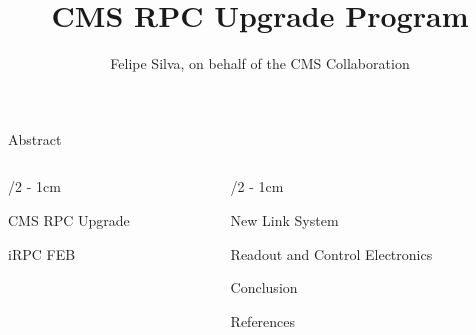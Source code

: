 \documentclass[portrait]{uioposter}
\title{CMS RPC Upgrade Program}
\author
{%
    Felipe Silva, on behalf of the CMS Collaboration
}
\institute
{
   Rio de Janeiro State University - Email: felipe.silva@cern.ch
}
\begin{document}
\begin{frame}


    \begin{block}{Abstract}
        \vskip-1.5cm
        
    \end{block}

\begin{columns}[onlytextwidth]

\begin{column}{\textwidth/2 - 1cm}

    \vskip-2cm
    \begin{block}{CMS RPC Upgrade}
        \vskip-1.5cm
        
    \end{block}


    \vskip-2cm
    \begin{block}{iRPC FEB}
        \vskip-1.5cm
        
    \end{block}
    
\end{column}


\begin{column}{\textwidth/2 - 1cm}

    \vskip-2cm
    \begin{block}{New Link System}
        \vskip-1.5cm
        
    \end{block}

    \vskip-2cm
    \begin{block}{Readout and Control Electronics}
        \vskip-1.5cm
        
    \end{block}


    \vskip-2cm
    \begin{block}{Conclusion}
        \vskip-1.5cm
        
    \end{block}

    \vskip-2cm
    \begin{block}{References}
        \printbibliography
    \end{block}


\end{column}



\end{columns}
\end{frame}
\end{document}
